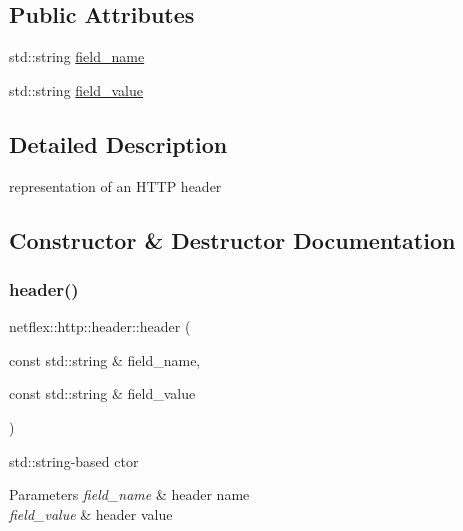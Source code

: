 \subsection*{Public Attributes}
\begin{DoxyCompactItemize}
\item 
std\+::string \hyperlink{structnetflex_1_1http_1_1header_ae72e56634fc6e2ec9ce4ff1bd633eaff}{field\+\_\+name}
\item 
std\+::string \hyperlink{structnetflex_1_1http_1_1header_ab8ddd4c11c3775694f64976b5be29753}{field\+\_\+value}
\end{DoxyCompactItemize}


\subsection{Detailed Description}
representation of an H\+T\+TP header 

\subsection{Constructor \& Destructor Documentation}
\mbox{\label{structnetflex_1_1http_1_1header_a85972735c6bd2e9ae331aa939c5631a6}} 
\subsubsection{\texorpdfstring{header()}{header()}\hspace{0.1cm}{\footnotesize\ttfamily [1/3]}}
{\footnotesize\ttfamily netflex\+::http\+::header\+::header (\begin{DoxyParamCaption}\item[{const std\+::string \&}]{field\+\_\+name,  }\item[{const std\+::string \&}]{field\+\_\+value }\end{DoxyParamCaption})}

std\+::string-\/based ctor


\begin{DoxyParams}{Parameters}
{\em field\+\_\+name} & header name \\
\hline
{\em field\+\_\+value} & header value \\
\hline
\end{DoxyParams}
\mbox{\label{structnetflex_1_1http_1_1header_a5db781aa4a73145ec8054c8d7521be27}} 
